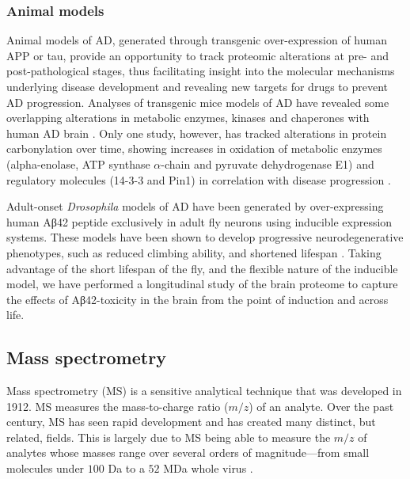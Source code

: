 \subsubsection{Animal models}

Animal models of AD, generated through transgenic over-expression of human APP or tau, provide an opportunity to track proteomic alterations at pre- and post-pathological stages, thus facilitating insight into the molecular mechanisms underlying disease development and revealing new targets for drugs to prevent AD progression.
Analyses of transgenic mice models of AD have revealed some overlapping alterations in metabolic enzymes, kinases and chaperones with human AD brain \cite{Moya-Alvarado2016}.
Only one study, however, has tracked alterations in protein carbonylation over time, showing increases in oxidation of metabolic enzymes (alpha-enolase, ATP synthase $\alpha$-chain and pyruvate dehydrogenase E1) and regulatory molecules (14-3-3 and Pin1) in correlation with disease progression \cite{Sultana2011}.

Adult-onset \textit{Drosophila} models of AD have been generated by over-expressing human Aβ42 peptide exclusively in adult fly neurons using inducible expression systems.
These models have been shown to develop progressive neurodegenerative phenotypes, such as reduced climbing ability, and shortened lifespan \cite{Sofola2010}.
Taking advantage of the short lifespan of the fly, and the flexible nature of the inducible model, we have performed a longitudinal study of the brain proteome to capture the effects of Aβ42-toxicity in the brain from the point of induction and across life.


\subsection{Mass spectrometry}

Mass spectrometry (MS) is a sensitive analytical technique that was developed in 1912.
MS measures the mass-to-charge ratio ($m/z$) of an analyte.
Over the past century, MS has seen rapid development and has created many distinct, but related, fields.
This is largely due to MS being able to measure the $m/z$ of analytes whose masses range over several orders of magnitude---from small molecules under $100$ Da to a $52$ MDa whole virus \cite{Keifer2016}.

